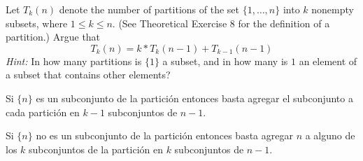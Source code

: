 \item Let $T_k(n)$ denote the number of partitions of the set $\{1, \dots, n\}$ into $k$ nonempty subsets, where $1 \le k \le n$. (See Theoretical Exercise 8 for the definition of a partition.) Argue that
\[ T_k(n) = k * T_k(n - 1) + T_{k-1}(n - 1) \]
\emph{Hint:} In how many partitions is $\{1\}$ a subset, and in how many is $1$ an element of a subset that contains other elements?

Si $\{n\}$ es un subconjunto de la partición entonces basta agregar el subconjunto a cada partición en $k-1$ subconjuntos de $n-1$.

Si $\{n\}$ no es un subconjunto de la partición entonces basta agregar $n$ a alguno de los $k$ subconjuntos de la partición en $k$ subconjuntos de $n-1$.